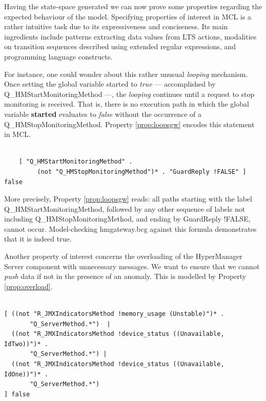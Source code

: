 	  
	Having the state-space generated we can now prove some properties regarding the expected behaviour of the model.
	Specifying properties of interest in \ac{MCL} is a rather intuitive task due to its expressiveness and conciseness. 
	Its main ingredients include patterns extracting data values from \ac{LTS} actions,
	modalities on transition sequences described using extended regular expressions, 
	and programming language constructs.
	
	For instance, one could  wonder about this rather unusual \textit{looping} mechanism. Once 
	setting the global variable \textsf{started} to \textit{true} 
	--- accomplished by \textsf{Q\_HMStartMonitoringMethod} ---, the \textit{looping} continues until a 
	request to stop monitoring is received. That is, there is no execution path in 
	which the global variable \textbf{started} evaluates to \textit{false} without the occurrence of 
	a \textsf{Q\_HMStopMonitoringMethod}.	 Property \ref{prop:loopsgw} encodes this statement in \ac{MCL}.


\begin{property}
\label{prop:loopsgw}
\begin{verbatim}
	
	[ "Q_HMStartMonitoringMethod" . 
	     (not "Q_HMStopMonitoringMethod")* . "GuardReply !FALSE" ] false
\end{verbatim}
\end{property}%


	\noindent More precisely, Property \ref{prop:loopsgw} reads: all paths starting with the label \textsf{Q\_HMStartMonitoringMethod},
	followed by any other sequence of labels not including \textsf{Q\_HMStopMonitoringMethod}, and
	ending by \textsf{GuardReply !FALSE}, cannot occur. Model-checking \textsf{hmgateway.bcg}  against this formula
	demonstrates that it is indeed true.
	

	Another property of interest concerns the overloading of the \textsf{HyperManager Server} component
	with unnecessary messages. We want to ensure that we cannot
	\textit{push} data if not in the presence of an anomaly. This is modelled by Property \ref{prop:overload}.

\begin{property}
\label{prop:overload}

 \begin{verbatim}
 
[ ((not "R_JMXIndicatorsMethod !memory_usage (Unstable)")* . 
       "Q_ServerMethod.*")  |
  ((not "R_JMXIndicatorsMethod !device_status ((Unavailable, IdTwo))")* . 
       "Q_ServerMethod.*") |
  ((not "R_JMXIndicatorsMethod !device_status ((Unavailable, IdOne))")* . 
       "Q_ServerMethod.*") 
] false
 \end{verbatim}
  \end{property}


